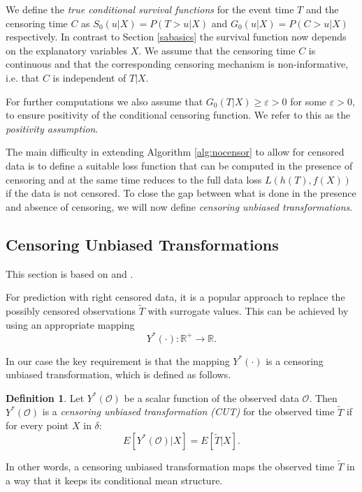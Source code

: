 \documentclass[12pt, a4paper]{scrartcl}
\theoremstyle{definition}
\newtheorem{Definition}{Definition}[section]
\theoremstyle{plain}
\numberwithin{equation}{section}
\numberwithin{figure}{section}
\numberwithin{table}{section}
\begin{document}
	 We define the \emph{true conditional survival functions} for the event time $T$ and the censoring time $C$ as $S_0(u \vert X)=P(T>u \vert X)$ and $G_0(u \vert X)=P(C>u \vert X)$ respectively.
	 In contrast to Section \ref{sabasics} the survival function now depends on the explanatory variables $X$.
	 We assume that the censoring time $C$ is continuous and that the corresponding censoring mechanism is non-informative, i.e. that $C$ is independent of $T\vert X$.
	 
	 For further computations we also assume that $G_0(T \vert X)\geq \varepsilon > 0$ for some $\varepsilon >0$, to ensure positivity of the conditional censoring function.
	 We refer to this as the \emph{positivity assumption}.
	
	The main difficulty in extending Algorithm \ref{alg:nocensor} to allow for censored data is to define a suitable loss function that can be computed in the presence of censoring and at the same time reduces to the full data loss $L(h(T), f(X))$ if the data is not censored.
	To close the gap between what is done in the presence and absence of censoring, we will now define \textit{censoring unbiased transformations}.
	
	\subsection{Censoring Unbiased Transformations}\label{sec:drtrafo}
	This section is based on \citet*{culs} and \citet*{drcut}.
	
	For prediction with right censored data, it is a popular approach to replace the possibly censored observations $\tilde T$ with surrogate values.
	This can be achieved by using an appropriate mapping $$Y^*(\cdot): \mathbb{R}^+ \to \mathbb{R}.$$
	
	In our case the key requirement is that the mapping $Y^*(\cdot)$ is a censoring unbiased transformation, which is defined as follows.
	
	\begin{Definition}
	Let $Y^*(\mathcal{O})$ be a scalar function of the observed data $\mathcal{O}$.
	Then $Y^*(\mathcal{O})$ is a \textit{censoring unbiased transformation (CUT)} for the observed time $\tilde T$ if for every point $X$ in $\delta$:
	\begin{equation*}
	E[Y^*(\mathcal{O}) \vert X] = E[\tilde T \vert X].
	\end{equation*}
	\end{Definition}

	In other words, a censoring unbiased transformation maps the observed time $\tilde T$ in a way that it keeps its conditional mean structure.
	
\end{document}
